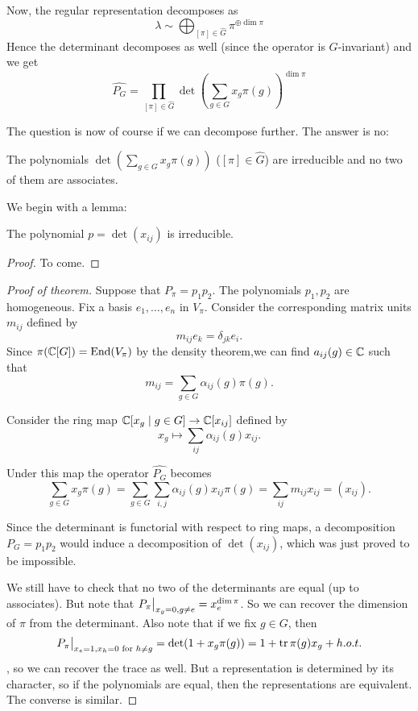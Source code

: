 \documentclass[11pt, english]{article}
\begin{document}
Now, the regular representation decomposes as
$$
\lambda \sim \bigoplus_{[\pi] \in \widehat G}  \pi^{\oplus \dim \pi}
$$
Hence the determinant decomposes as well (since the operator is $G$-invariant) and we get
$$
\widehat{P_G} = \prod_{[\pi] \in \widehat G} \det\left( \sum_{g \in G} x_g \pi(g) \right)^{\dim \pi}
$$

The question is now of course if we can decompose further. The answer is no:

\begin{thm}[Frobenius]
The polynomials $\det\left(\sum_{g \in G} x_g \pi(g) \right)$ ($[\pi] \in \widehat G$) are irreducible and no two of them are associates.
\end{thm}

We begin with a lemma:
\begin{lemma}
 The polynomial $p=\det (x_{ij})$ is irreducible.
\end{lemma}

\begin{proof}
  To come.
\end{proof}

\begin{proof}[Proof of theorem]
  
Suppose that $P_\pi=p_1p_2$. The polynomials $p_1,p_2$ are homogeneous. Fix a basis $e_1,\ldots,e_n$ in $V_\pi$. Consider the corresponding matrix units $m_{ij}$ defined by
$$
m_{ij} e_k = \delta_{jk}e_i.
$$
Since $\pi(\mathbb{C}[G]) = \operatorname{End}(V_\pi)$ by the density theorem,we can find $a_{ij}(g) \in \mathbb{C}$ such that
$$
m_{ij} = \sum_{g \in G} \alpha_{ij}(g) \pi(g).
$$

Consider the ring map $\mathbb{C}[x_g \mid g \in G] \to \mathbb{C}[x_{ij}]$ defined by
$$
x_g \mapsto \sum_{ij} \alpha_{ij}(g) x_{ij}.
$$

Under this map the operator $\widehat{P_G}$ becomes
$$
\sum_{g \in G} x_g \pi(g) = \sum_{g \in G} \sum_{i,j} \alpha_{ij}(g) x_{ij} \pi(g) = \sum_{ij} m_{ij} x_{ij} = (x_{ij}).
$$

Since the determinant is functorial with respect to ring maps, a decomposition $P_G=p_1p_2$ would induce a decomposition of $\det (x_{ij})$, which was just proved to be impossible.

We still have to check that no two of the determinants are equal (up to associates). But note that $\restr{P_\pi}{x_g = 0, g \neq e}=x_e^{\dim \pi}$. So we can recover the dimension of $\pi$ from the determinant. Also note that if we fix $g \in G$, then
$$
\restr{P_\pi}{x_e=1, x_h =0 \text{ for } h \neq g} = \det(1+x_g\pi(g))=1+\tr \pi(g)x_g + h.o.t.
$$,
so we can recover the trace as well. But a representation is determined by its character, so if the polynomials are equal, then the representations are equivalent. The converse is similar.
\end{proof}
\end{document}
